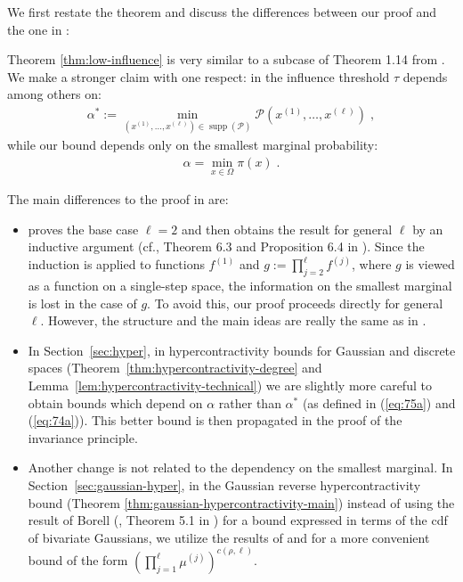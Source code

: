 \documentclass{daj}
\newcommand{\1}{\mathbbm{1}}
\theoremstyle{plain}
\theoremstyle{definition}
\DeclareMathOperator*{\supp}{supp}
\begin{document}
We first restate the theorem and discuss the differences between
our proof and the one in \cite{Mos10}:
\lowinfluence*

Theorem \ref{thm:low-influence} is very similar to a subcase of Theorem 1.14
from \cite{Mos10}.  We make a stronger claim with one respect: in
\cite{Mos10} the influence threshold $\tau$ depends among others on:
\begin{align}
\label{eq:74a}
  \alpha^* := \min_{(x^{(1)}, \ldots, x^{(\ell)}) \in \supp(\mathcal{P})} 
  \mathcal{P}(x^{(1)}, \ldots, x^{(\ell)}) \; ,
\end{align}
while our bound depends only on the smallest marginal probability:
\begin{align}
\label{eq:75a}
\alpha = \min_{x \in \Omega} \pi(x) \; .
\end{align}

The main differences to the proof in \cite{Mos10} are:
\begin{itemize}
\item \cite{Mos10} proves the base case $\ell=2$ and then obtains the result
for general $\ell$ by an inductive argument 
(cf., Theorem 6.3 and Proposition 6.4 in \cite{Mos10}). Since the induction
is applied to functions $f^{(1)}$ and $g := \prod_{j=2}^{\ell} f^{(j)}$,
where $g$ is viewed as a function on a single-step space, the information 
on the smallest marginal is lost in the case of $g$. To avoid this, our proof
proceeds directly for general $\ell$. However, the structure 
and the main ideas are really the same as in \cite{Mos10}.
\item In Section~\ref{sec:hyper}, in hypercontractivity bounds for Gaussian
  and discrete spaces
(Theorem~\ref{thm:hypercontractivity-degree} and 
Lemma~\ref{lem:hypercontractivity-technical}) we are slightly more careful
to obtain bounds which depend on $\alpha$ rather than $\alpha^*$
(as defined in (\ref{eq:75a}) and (\ref{eq:74a})). This better
bound is then propagated in the proof of the invariance principle.
\item Another change is not related to the dependency on the smallest 
  marginal. In Section~\ref{sec:gaussian-hyper},
  in the Gaussian reverse hypercontractivity bound
(Theorem \ref{thm:gaussian-hypercontractivity-main}) instead of
using the result of Borell (\cite{Bor85}, Theorem 5.1 in \cite{Mos10}) 
for a bound expressed in terms of the cdf
of bivariate Gaussians, we utilize the results of \cite{CDP13} and \cite{Led14}
 for a more convenient bound
of the form $\left(\prod_{j=1}^\ell \mu^{(j)}\right)^{c(\rho, \ell)}$.
\end{itemize}
\end{document}
